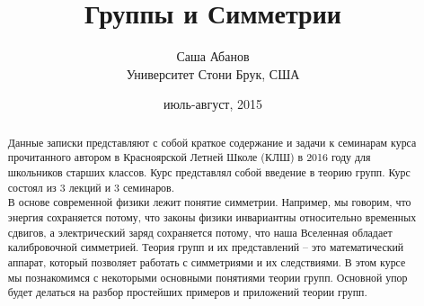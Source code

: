 \documentclass[amsmath,amssymb,12pt]{revtex4}
\newcommand{\1}{\frac{1}{2}}
\begin{document}
\title{Группы и Симметрии}
\author{Саша Абанов\\
{\small Университет Стони Брук, США}}

\date{июль-август, 2015}


%
%
%
%



\begin{abstract}
Данные записки представляют с собой краткое содержание и задачи к семинарам курса прочитанного автором в Красноярской Летней Школе (КЛШ) в 2016 году для школьников старших классов. Курс представлял собой введение в теорию групп. Курс состоял из 3 лекций и 3 семинаров. \\

В основе современной физики лежит понятие симметрии. Например, мы говорим, что энергия сохраняется потому, что законы физики инвариантны относительно временных сдвигов, а электрический заряд сохраняется потому, что наша Вселенная обладает калибровочной симметрией. Теория групп и их представлений – это математический аппарат, который позволяет работать с симметриями и их следствиями. В этом курсе мы познакомимся с некоторыми основными понятиями теории групп. Основной упор будет делаться на разбор простейших примеров и приложений теории групп. 

\end{abstract}
\end{document}
